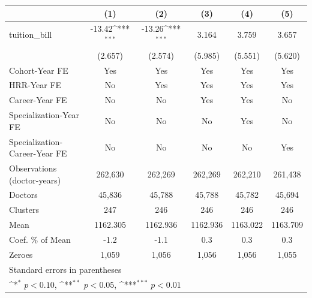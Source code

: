 {
\def\sym#1{\ifmmode^{#1}\else\(^{#1}\)\fi}
\begin{tabular}{l*{5}{c}}
\hline\hline
                    &\multicolumn{1}{c}{(1)}         &\multicolumn{1}{c}{(2)}         &\multicolumn{1}{c}{(3)}         &\multicolumn{1}{c}{(4)}         &\multicolumn{1}{c}{(5)}         \\
\hline
tuition\_bill        &      -13.42\sym{***}&      -13.26\sym{***}&       3.164         &       3.759         &       3.657         \\
                    &     (2.657)         &     (2.574)         &     (5.985)         &     (5.551)         &     (5.620)         \\
[1em]
Cohort-Year FE      &         Yes         &         Yes         &         Yes         &         Yes         &         Yes         \\
[1em]
HRR-Year FE         &          No         &         Yes         &         Yes         &         Yes         &         Yes         \\
[1em]
Career-Year FE      &          No         &          No         &         Yes         &         Yes         &          No         \\
[1em]
Specialization-Year FE&          No         &          No         &          No         &         Yes         &          No         \\
[1em]
Specialization-Career-Year FE&          No         &          No         &          No         &          No         &         Yes         \\
\hline
Observations (doctor-years)&     262,630         &     262,269         &     262,269         &     262,210         &     261,438         \\
Doctors             &      45,836         &      45,788         &      45,788         &      45,782         &      45,694         \\
Clusters            &         247         &         246         &         246         &         246         &         246         \\
Mean                &    1162.305         &    1162.936         &    1162.936         &    1163.022         &    1163.709         \\
Coef. \% of Mean    &        -1.2         &        -1.1         &         0.3         &         0.3         &         0.3         \\
Zeroes              &       1,059         &       1,056         &       1,056         &       1,056         &       1,055         \\
\hline\hline
\multicolumn{6}{l}{\footnotesize Standard errors in parentheses}\\
\multicolumn{6}{l}{\footnotesize \sym{*} \(p<0.10\), \sym{**} \(p<0.05\), \sym{***} \(p<0.01\)}\\
\end{tabular}
}

